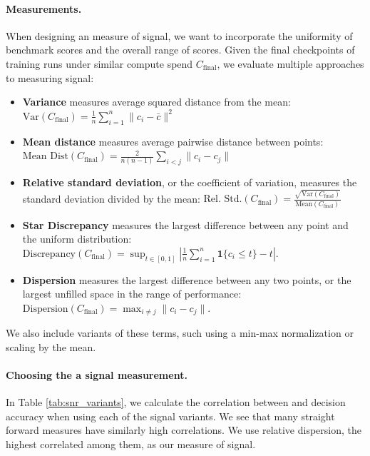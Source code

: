\paragraph{Measurements.}
When designing an measure of signal{}, we want to incorporate the uniformity of benchmark scores and the overall range of scores. Given the final checkpoints of training runs under similar compute spend $C_\text{final}$, we evaluate multiple approaches to measuring signal{}:

\begin{itemize}[itemsep=0pt, topsep=0pt]
    \item \textbf{Variance} measures average squared distance from the mean: $\text{Var}(C_\text{final}) = \frac{1}{n} \sum_{i=1}^{n} \|c_i - \bar{c}\|^2$
    \item \textbf{Mean distance} measures average pairwise distance between points: $\text{Mean Dist}(C_\text{final}) = \frac{2}{n(n-1)} \sum_{i < j} \|c_i - c_j\|$
    \item \textbf{Relative standard deviation}, or the coefficient of variation, measures the standard deviation divided by the mean: $\text{Rel. Std.}(C_\text{final}) = \frac{\sqrt{\text{Var}(C_\text{final})}}{\text{Mean}(C_\text{final})}$
    \item \textbf{Star Discrepancy} measures the largest difference between any point and the uniform distribution: $\text{Discrepancy}(C_\text{final}) = \sup_{t \in [0,1]} \left| \frac{1}{n} \sum_{i=1}^n \mathbf{1}\{c_i \leq t\} - t \right|$. 
    \item \textbf{Dispersion} measures the largest difference between any two points, or the largest unfilled space in the range of performance: $\text{Dispersion}(C_\text{final}) = \max_{i \neq j} \|c_i - c_j\|$. 
\end{itemize}

 We also include variants of these terms, such using a min-max normalization or scaling by the mean.

\paragraph{Choosing the a signal{} measurement.}
In Table \ref{tab:snr_variants}, we calculate the correlation between \snr{} and decision accuracy when using each of the signal{} variants. We see that many straight forward measures have similarly high correlations. We use relative dispersion, the highest correlated among them, as our measure of signal{}. 


